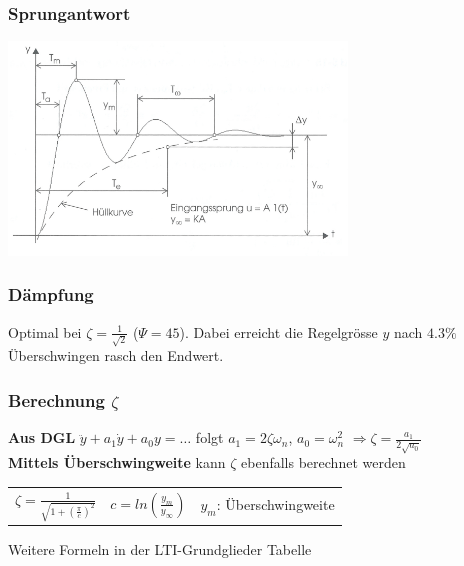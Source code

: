   \begin{multicols}{2}
	\subsubsection{Sprungantwort}
	\includegraphics[width = 9cm]{./images/pt2StepResp}
	
	\subsubsection{Dämpfung}
	Optimal bei $\zeta=\frac{1}{\sqrt{2}}$ ($\Psi=45$).
	Dabei erreicht die Regelgrösse $y$ nach $4.3\%$ Überschwingen rasch den	Endwert.
		
    \subsubsection{Berechnung $\zeta$}
     \textbf{Aus DGL} $\ddot{y}+a_1\dot{y}+a_0 y=\ldots$ folgt $a_1=2\zeta\omega_n$, 
      $a_0=\omega_n^2$
      $\Rightarrow \zeta=\frac{a_1}{2\sqrt{a_0}}$ \\
      \textbf{Mittels Überschwingweite} kann $\zeta$ ebenfalls berechnet werden\\
      \begin{tabular}{p{2.5cm}p{2.5cm}p{4cm}}
        $\zeta = \frac{1}{\sqrt{1+(\frac{\pi}{c})^2}}$ & $c =ln(\frac{y_m}{y_{\infty}})$ & $y_m$: Überschwingweite
      \end{tabular}

		Weitere Formeln in der LTI-Grundglieder Tabelle
  \end{multicols}

